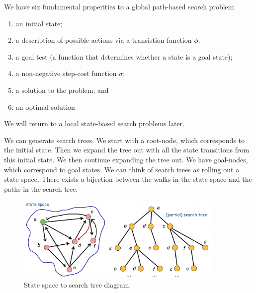 \begin{definition}
    We have six fundamental properities to a global path-based search problem:
    \begin{enumerate}
        \item an initial state;
        \item a description of possible actions via a transistion function $\phi$;
        \item a goal test (a function that determines whether a state is a goal state);
        \item a non-negative step-cost function $\sigma$;
        \item a solution to the problem; and
        \item an optimal solution
    \end{enumerate}
\end{definition}

We will return to a local state-based search problems later.

We can generate search trees. We start with a root-node, which corresponds to the initial state. Then we expand the tree out with all the state transitions from this initial state. We then continue expanding the tree out.  We have goal-nodes, which correspond to goal states. We can think of search trees as rolling out a state space. There exists a bijection between the walks in the state space and the paths in the search tree.

\begin{figure}
    \centering
    \includegraphics[width = 0.9\textwidth]{images/search-tree.png}
    \caption{State space to search tree diagram.}
    \label{fig:search-tree}
\end{figure}
